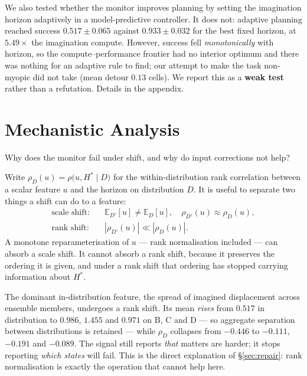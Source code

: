 \documentclass[twocolumn,10pt]{article}
\newcommand{\Hstar}{H^{*}}
\begin{document}
We also tested whether the monitor improves planning by setting the imagination horizon
adaptively in a model-predictive controller. It does not: adaptive planning reached success
$0.517 \pm 0.065$ against $0.933 \pm 0.032$ for the best fixed horizon, at $5.49\times$ the
imagination compute. However, success fell \emph{monotonically} with horizon, so the
compute--performance frontier had no interior optimum and there was nothing for an adaptive
rule to find; our attempt to make the task non-myopic did not take (mean detour $0.13$ cells).
We report this as a \textbf{weak test} rather than a refutation. Details in the appendix.

\section{Mechanistic Analysis}
\label{sec:mech}

Why does the monitor fail under shift, and why do input corrections not help?

Write $\rho_D(u) = \rho\big(u, \Hstar \mid D\big)$ for the within-distribution rank correlation
between a scalar feature $u$ and the horizon on distribution $D$. It is useful to separate two
things a shift can do to a feature:
\begin{align}
\text{scale shift:} \quad & \mathbb{E}_{D'}[u] \ne \mathbb{E}_{D}[u], \quad \rho_{D'}(u) \approx \rho_{D}(u), \\
\text{rank shift:} \quad & |\rho_{D'}(u)| \ll |\rho_{D}(u)|.
\end{align}
A monotone reparameterisation of $u$ --- rank normalisation included --- can absorb a scale
shift. It cannot absorb a rank shift, because it preserves the ordering it is given, and under
a rank shift that ordering has stopped carrying information about $\Hstar$.

The dominant in-distribution feature, the spread of imagined displacement across ensemble
members, undergoes a rank shift. Its mean \emph{rises} from $0.517$ in distribution to
$0.986$, $1.455$ and $0.971$ on B, C and D --- so aggregate separation between distributions is
retained --- while $\rho_D$ collapses from $-0.446$ to $-0.111$, $-0.191$ and $-0.089$. The
signal still reports \emph{that} matters are harder; it stops reporting \emph{which states}
will fail. This is the direct explanation of \S\ref{sec:repair}: rank normalisation is exactly
the operation that cannot help here.
\end{document}
